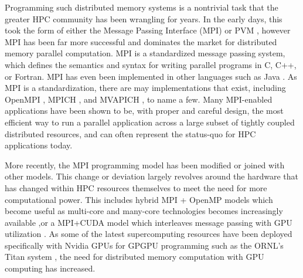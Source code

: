 Programming such distributed memory systems is a nontrivial task that the greater HPC community has been wrangling for years. In the early days, this took the form of either the Message Passing Interface (MPI) \cite{mpi} or PVM \cite{geist1994pvm}, however MPI has been far more successful and dominates the market for distributed memory parallel computation. MPI is a standardized message passing system, which defines the semantics and syntax for writing parallel programs in C, C++, or Fortran. MPI has even been implemented in other languages such as Java \cite{carpenter2000mpj}.  As MPI is a standardization, there are may implementations that exist, including OpenMPI \cite{gabriel2004open}, MPICH \cite{gropp1999using}, and MVAPICH \cite{koop2008mvapich}, to name a few. Many MPI-enabled applications have been shown to be, with proper and careful design, the most efficient way to run a parallel application across a large subset of tightly coupled distributed resources, and can often represent the status-quo for HPC applications today. 

More recently, the MPI programming model has been modified or joined with other models. This change or deviation largely revolves around the hardware that has changed within HPC resources themselves to meet the need for more computational power. This includes hybrid MPI + OpenMP models which become useful as multi-core and many-core technologies becomes increasingly available \cite{rabenseifner2009hybrid},or a MPI+CUDA model which interleaves message passing with GPU utilization \cite{jacobsen2010mpi}.  As some of the latest supercomputing resources have been deployed specifically with Nvidia GPUs for GPGPU programming such as the ORNL's Titan system \cite{bland2012titan}, the need for distributed memory computation with GPU computing has increased.  

